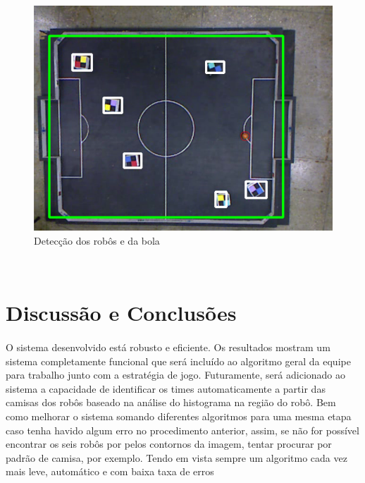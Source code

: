 \documentclass[conference, harvard, brazil, english]{sbatex}
\begin{document}
		\begin{figure}[h]
			\centering
			\includegraphics[scale=0.3]{ball_detection}
			\caption{Detecção dos robôs e da bola}
		\end{figure}\\
		
		
	\section{Discussão e Conclusões}
	\paragraph{}
	O sistema desenvolvido está robusto e eficiente. Os resultados mostram um sistema completamente funcional que será incluído ao algoritmo geral da equipe para trabalho junto com a estratégia de jogo. Futuramente, será adicionado ao sistema a capacidade de identificar os times automaticamente a partir das camisas dos robôs baseado na análise do histograma na região do robô. Bem como melhorar o sistema somando diferentes algoritmos para uma mesma etapa caso tenha havido algum erro no procedimento anterior, assim, se não for possível encontrar os seis robôs por pelos contornos da imagem, tentar procurar por padrão de camisa, por exemplo. Tendo em vista sempre um algoritmo cada vez mais leve, automático e com baixa taxa de erros
	
	\medskip
	
	
	
\end{document}
